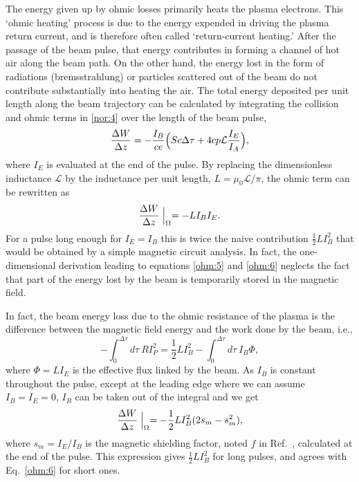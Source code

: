 \documentclass [12pt,a4paper,     ]{report} %
\begin{document}
	The energy given up by ohmic losses primarily heats the plasma electrons.  This `ohmic heating' process is due to the energy expended in driving the plasma return current, and is therefore often called `return-current heating.'  After the passage of the beam pulse, that energy contributes in forming a channel of hot air along the beam path.  On the other hand, the energy lost in the form of radiations (bremsstrahlung) or particles scattered out of  the beam do not contribute substantially into heating the air.  The total energy deposited per unit length along the beam trajectory can be calculated by integrating the collision and ohmic terms in \eqref{nor:4} over the length of the beam pulse,
%
\begin{equation}\label{ohm:5} %
    \frac{\Delta W}{\Delta z} = - \frac{I_B}{ce}
         \Bigl( Sc\Delta \tau + 4 cp\mathcal{L}\frac{I_E}{I_A} \Bigr),
\end{equation}
%
where $I_E$ is evaluated at the end of the pulse.  By replacing the dimensionless inductance $\mathcal{L}$ by the inductance per unit length, $L= \mu_0\mathcal{L}/{\pi}$, the ohmic term can be rewritten as
%
\begin{equation}\label{ohm:6} %
    \frac{\Delta W}{\Delta z}\Bigm|_{\Omega}  = - L I_B I_E.
\end{equation}
%
For a pulse long enough for $I_E=I_B$ this is twice the naive contribution $\frac{1}{2}L I_B^2$ that would be obtained by a simple magnetic circuit analysis.  In fact, the one-dimensional derivation leading to equations \eqref{ohm:5} and \eqref{ohm:6} neglects the fact that part of the energy lost by the beam is temporarily stored in the magnetic field.

   In fact, the beam energy loss due to the ohmic resistance of the plasma is the difference between the magnetic field energy and the work done by the beam, i.e.,
%
\begin{equation}\label{ohm:6A} %
       - \int_0^{\Delta \tau} d\tau~ R I_P^2 
       = \frac{1}{2} L I_B^2 
       - \int_0^{\Delta \tau} d\tau~ I_B \Phi,
\end{equation}
%
where $\Phi = L I_E$ is the effective flux linked by the beam.  As $I_B$ is constant throughout the pulse, except at the leading edge where we can assume $I_B = I_E = 0$,  $I_B$ can be taken out of the integral and we get \cite{LOVEL1971-}
%
\begin{equation}\label{ohm:7} %
        \frac{\Delta W}{\Delta z}\Bigm|_{\Omega}
      = - \frac{1}{2} L I_B^2 (2s_m-s_m^2),
\end{equation}
%
where $s_m=I_E/I_B$ is the magnetic shielding factor, noted $f$ in Ref.~\cite{LOVEL1971-}, calculated at the end of the pulse.  This expression gives $\frac{1}{2}L I_B^2$ for long pulses, and agrees with Eq.~\eqref{ohm:6} for short ones.
\end{document}
